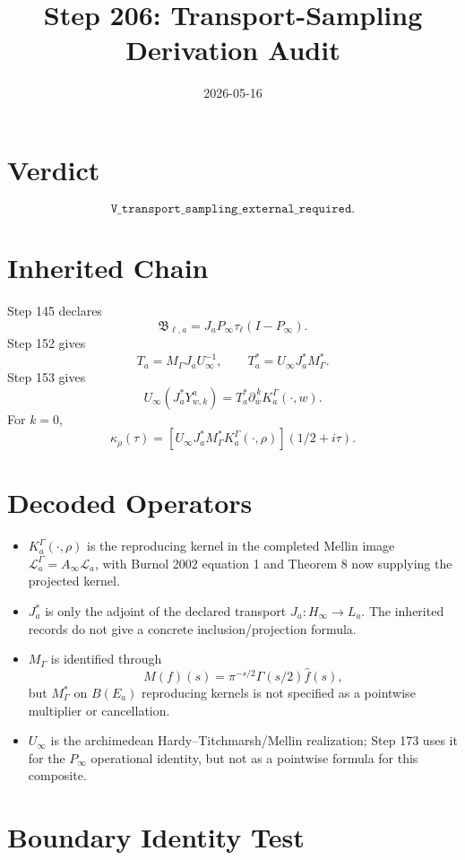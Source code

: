 \documentclass[11pt]{article}
\title{Step 206: Transport-Sampling Derivation Audit}
\date{2026-05-16}
\begin{document}
\maketitle

\section*{Verdict}
\[
\boxed{\texttt{V\_transport\_sampling\_external\_required}.}
\]

\section*{Inherited Chain}

Step 145 declares
\[
\mathfrak B_{\ell,a}=J_aP_\infty\tau_\ell(I-P_\infty).
\]
Step 152 gives
\[
T_a=M_\Gamma J_aU_\infty^{-1},\qquad
T_a^*=U_\infty J_a^*M_\Gamma^*.
\]
Step 153 gives
\[
U_\infty(J_a^*Y^a_{w,k})=
T_a^*\partial_{\overline w}^{\,k}K_a^\Gamma(\cdot,w).
\]
For \(k=0\),
\[
\kappa_{\rho}(\tau)
=\left[U_\infty J_a^*M_\Gamma^*K_a^\Gamma(\cdot,\rho)\right](1/2+i\tau).
\]

\section*{Decoded Operators}

\begin{itemize}
\item \(K_a^\Gamma(\cdot,\rho)\) is the reproducing kernel in the completed
Mellin image \(\mathcal L_a^\Gamma=A_\infty\mathcal L_a\), with Burnol 2002
equation 1 and Theorem 8 now supplying the projected kernel.
\item \(J_a^*\) is only the adjoint of the declared transport
\(J_a:H_\infty\to L_a\).  The inherited records do not give a concrete
inclusion/projection formula.
\item \(M_\Gamma\) is identified through
\[
M(f)(s)=\pi^{-s/2}\Gamma(s/2)\widehat f(s),
\]
but \(M_\Gamma^*\) on \(B(E_a)\) reproducing kernels is not specified as a
pointwise multiplier or cancellation.
\item \(U_\infty\) is the archimedean Hardy--Titchmarsh/Mellin realization;
Step 173 uses it for the \(P_\infty\) operational identity, but not as a
pointwise formula for this composite.
\end{itemize}

\section*{Boundary Identity Test}
\end{document}
